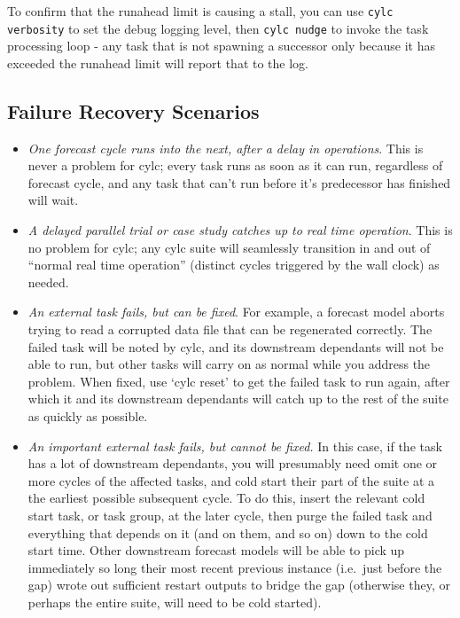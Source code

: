\documentclass[11pt,a4paper]{article}
\begin{document}
To confirm that the runahead limit is causing a stall, you can use 
\lstinline=cylc verbosity= to set the debug logging level, then
\lstinline=cylc nudge= to invoke the task processing loop - any task
that is not spawning a successor only because it has exceeded the runahead
limit will report that to the log.


\subsection{Failure Recovery Scenarios}
\label{FailureRecoveryScenarios}

\begin{itemize}
    \item {\em One forecast cycle runs into the next, after a delay in
        operations}. This is never a problem for cylc; every task runs
        as soon as it can run, regardless of forecast cycle, and any
        task that can't run before it's predecessor has finished will
        wait.

    \item {\em A delayed parallel trial or case study catches up to real
        time operation}. This is no problem for cylc; any cylc suite
        will seamlessly transition in and out of ``normal real time
        operation'' (distinct cycles triggered by the wall clock) as needed.

    \item {\em An external task fails, but can be fixed}. For example, a
        forecast model aborts trying to read a corrupted data file that
        can be regenerated correctly. The failed task will be noted by
        cylc, and its downstream dependants will not be able to run,
        but other tasks will carry on as normal while you address the
        problem. When fixed, use `cylc reset' to get the failed task to
        run again, after which it and its downstream dependants will
        catch up to the rest of the suite as quickly as possible.

    \item {\em An important external task fails, but cannot be fixed.}
        In this case, if the task has a lot of downstream dependants,
        you will presumably need omit one or more cycles of the affected
        tasks, and cold start their part of the suite at a the earliest
        possible subsequent cycle.  To do this, insert the relevant cold
        start task, or task group, at the later cycle, then purge the
        failed task and everything that depends on it (and on them, and
        so on) down to the cold start time.  Other downstream forecast
        models will be able to pick up immediately so long their most
        recent previous instance (i.e.\ just before the gap) wrote out
        sufficient restart outputs to bridge the gap (otherwise they,
        or perhaps the entire suite, will need to be cold started). 


\end{itemize}
\end{document}
